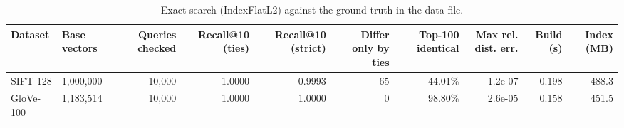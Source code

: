 \begin{table}[t]
\centering
\small
\caption{Exact search (IndexFlatL2) against the ground truth in the data file.}
\label{tab:t1a_exact_check}
\begin{tabular}{llrrrrrrrr}
\toprule
Dataset & Base vectors & Queries checked & Recall@10 (ties) & Recall@10 (strict) & Differ only by ties & Top-100 identical & Max rel. dist. err. & Build (s) & Index (MB) \\
\midrule
SIFT-128 & 1,000,000 & 10,000 & 1.0000 & 0.9993 & 65 & 44.01\% & 1.2e-07 & 0.198 & 488.3 \\
GloVe-100 & 1,183,514 & 10,000 & 1.0000 & 1.0000 & 0 & 98.80\% & 2.6e-05 & 0.158 & 451.5 \\
\bottomrule
\end{tabular}
\end{table}
